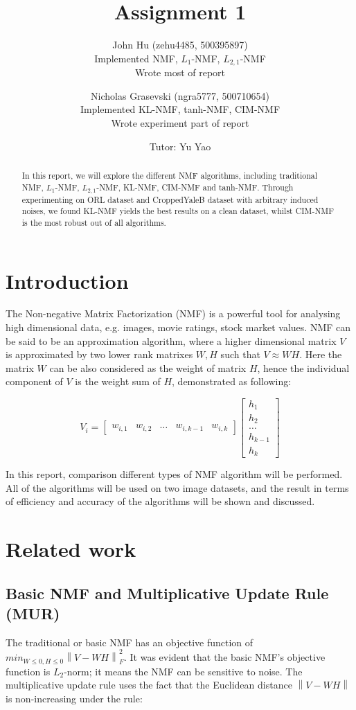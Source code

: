 \documentclass{article} %
\title{Assignment 1}
\author{
  John Hu (zehu4485, 500395897)\\
  Implemented NMF, $L_1$-NMF, $L_{2,1}$-NMF\\
  Wrote most of report
  \and
  Nicholas Grasevski (ngra5777, 500710654)\\
  Implemented KL-NMF, tanh-NMF, CIM-NMF\\
  Wrote experiment part of report
  \and
  Tutor: Yu Yao
}
\begin{document}
\maketitle

\begin{abstract}
In this report, we will explore the different NMF algorithms, including traditional NMF, $L_1$-NMF, $L_{2,1}$-NMF, KL-NMF, CIM-NMF and tanh-NMF. Through experimenting on ORL dataset and CroppedYaleB dataset with arbitrary induced noises, we found KL-NMF yields the best results on a clean dataset, whilst CIM-NMF is the most robust out of all algorithms.
\end{abstract}

\section{Introduction}
The Non-negative Matrix Factorization (NMF) is a powerful tool for analysing high dimensional data, e.g. images, movie ratings, stock market values. NMF can be said to be an approximation algorithm, where a higher dimensional matrix $V$ is approximated by two lower rank matrixes $W,H$ such that $V \approx WH$. \cite{wang-zhang} Here the matrix $W$ can be also considered as the weight of matrix $H$, hence the individual component of $V$ is the weight sum of $H$, demonstrated as following:

\begin{equation}
V_i = \begin{bmatrix}
w_{i,1} & w_{i,2} & \dots & w_{i,k-1} & w_{i,k}
\end{bmatrix} \begin{bmatrix}
h_1\\
h_2\\
\dots\\
h_{k-1}\\
h_k
\end{bmatrix}
\end{equation}

In this report, comparison different types of NMF algorithm will be performed. All of the algorithms will be used on two image datasets, and the result in terms of efficiency and accuracy of the algorithms will be shown and discussed.

\section{Related work}
\subsection{Basic NMF and Multiplicative Update Rule (MUR)}
The traditional or basic NMF has an objective function of $min_{W \leq 0, H \leq 0}\left\|V - WH\right\|_F^2$. \cite{lee-seung} It was evident that the basic NMF's objective function is $L_2$-norm; it means the NMF can be sensitive to noise. The multiplicative update rule uses the fact that the Euclidean distance $\left\|V - WH\right\|$ is non-increasing under the rule:
\end{document}

